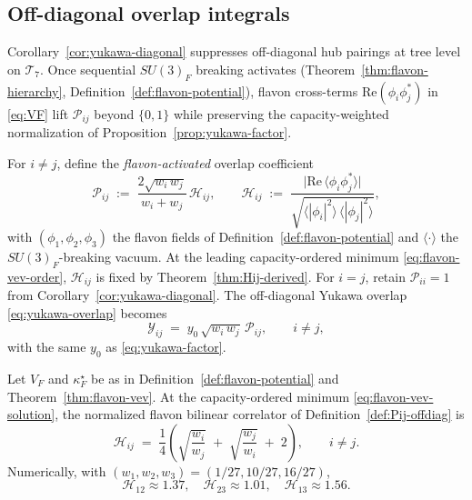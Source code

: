 \subsection{Off-diagonal overlap integrals}
\label{sec:yukawa:offdiag}

Corollary~\ref{cor:yukawa-diagonal} suppresses off-diagonal hub pairings at
tree level on $\mathcal{T}_7$. Once sequential $SU(3)_F$ breaking activates
(Theorem~\ref{thm:flavon-hierarchy}, Definition~\ref{def:flavon-potential}), flavon
cross-terms $\mathrm{Re}(\phi_i\phi_j^*)$ in \eqref{eq:VF} lift
$\mathcal{P}_{ij}$ beyond $\{0,1\}$ while preserving the capacity-weighted
normalization of Proposition~\ref{prop:yukawa-factor}.

\begin{definition}\label{def:Pij-offdiag}
For $i\neq j$, define the \emph{flavon-activated} overlap coefficient
\begin{equation}\label{eq:Pij-offdiag}
  \mathcal{P}_{ij}
  \;:=\;
  \frac{2\sqrt{w_i\,w_j}}{w_i+w_j}\,
  \mathcal{H}_{ij},
  \qquad
  \mathcal{H}_{ij}
  \;:=\;
  \frac{\bigl|\mathrm{Re}\,\langle\phi_i\phi_j^*\rangle\bigr|}
       {\sqrt{\langle|\phi_i|^2\rangle\,\langle|\phi_j|^2\rangle}},
\end{equation}
with $(\phi_1,\phi_2,\phi_3)$ the flavon fields of Definition~\ref{def:flavon-potential}
and $\langle\cdot\rangle$ the $SU(3)_F$-breaking vacuum. At the leading
capacity-ordered minimum \eqref{eq:flavon-vev-order}, $\mathcal{H}_{ij}$ is
fixed by Theorem~\ref{thm:Hij-derived}. For $i=j$, retain
$\mathcal{P}_{ii}=1$ from Corollary~\ref{cor:yukawa-diagonal}. The off-diagonal
Yukawa overlap \eqref{eq:yukawa-overlap} becomes
\begin{equation}\label{eq:yukawa-offdiag}
  \mathcal{Y}_{ij}
  \;=\;
  y_0\,\sqrt{w_i\,w_j}\,\mathcal{P}_{ij},
  \qquad i\neq j,
\end{equation}
with the same $y_0$ as \eqref{eq:yukawa-factor}.
\end{definition}

\begin{theorem}
\label{thm:Hij-derived}
Let $V_F$ and $\kappa_F^\star$ be as in Definition~\ref{def:flavon-potential}
and Theorem~\ref{thm:flavon-vev}. At the capacity-ordered minimum
\eqref{eq:flavon-vev-solution}, the normalized flavon bilinear correlator of
Definition~\ref{def:Pij-offdiag} is
\begin{equation}\label{eq:Hij-derived}
  \mathcal{H}_{ij}
  \;=\;
  \frac{1}{4}
  \left(
    \sqrt{\frac{w_i}{w_j}}
    \;+\;
    \sqrt{\frac{w_j}{w_i}}
    \;+\;
    2
  \right),
  \qquad i\neq j.
\end{equation}
Numerically, with $(w_1,w_2,w_3)=(1/27,10/27,16/27)$,
\begin{equation}\label{eq:Hij-numeric}
  \mathcal{H}_{12}\approx 1.37,\quad
  \mathcal{H}_{23}\approx 1.01,\quad
  \mathcal{H}_{13}\approx 1.56.
\end{equation}
\end{theorem}

